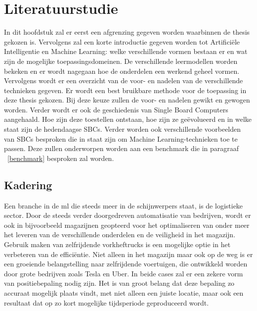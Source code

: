 \chapter{Literatuurstudie}

In dit hoofdstuk zal er eerst een afgrenzing gegeven worden waarbinnen de thesis gekozen is. Vervolgens zal een korte introductie gegeven worden tot Artifici\"ele Intelligentie en Machine Learning: welke verschillende vormen bestaan er en wat zijn de mogelijke toepassingsdomeinen. De verschillende leermodellen worden bekeken en er wordt nagegaan hoe de onderdelen een werkend geheel vormen. Vervolgens wordt er een overzicht van de voor- en nadelen van de verschillende technieken gegeven. Er wordt een best bruikbare methode voor de toepassing in deze thesis gekozen. Bij deze keuze zullen de voor- en nadelen gewikt en gewogen worden. Verder wordt er ook de geschiedenis van Single Board Computers aangehaald. Hoe zijn deze toestellen ontstaan, hoe zijn ze ge\"evolueerd en in welke staat zijn de hedendaagse SBCs. Verder worden ook verschillende voorbeelden van SBCs besproken die in staat zijn om Machine Learning-technieken toe te passen. Deze zullen onderworpen worden aan een benchmark die in paragraaf ~\ref{benchmark} besproken zal worden.


\newpage

\section{Kadering}

Een branche in de \gls{ml} die steeds meer in de schijnwerpers staat, is de logistieke sector\cite{barreto2017industry}. Door de steeds verder doorgedreven automatisatie van bedrijven, wordt er ook in bijvoorbeeld magazijnen geopteerd voor het optimaliseren van onder meer het leveren van de verschillende onderdelen en de veiligheid in het magazijn. Gebruik maken van zelfrijdende vorkheftrucks is een mogelijke optie in het verbeteren van de effici\"entie. Niet alleen in het magazijn maar ook op de weg is er een groeiende belangstelling naar zelfrijdende voertuigen, die ontwikkeld worden door grote bedrijven zoals Tesla en Uber. In beide cases zal er een zekere vorm van positiebepaling nodig zijn. Het is van groot belang dat deze bepaling zo accuraat mogelijk plaats vindt, met niet alleen een juiste locatie, maar ook een resultaat dat op zo kort mogelijke tijdsperiode geproduceerd wordt. 

